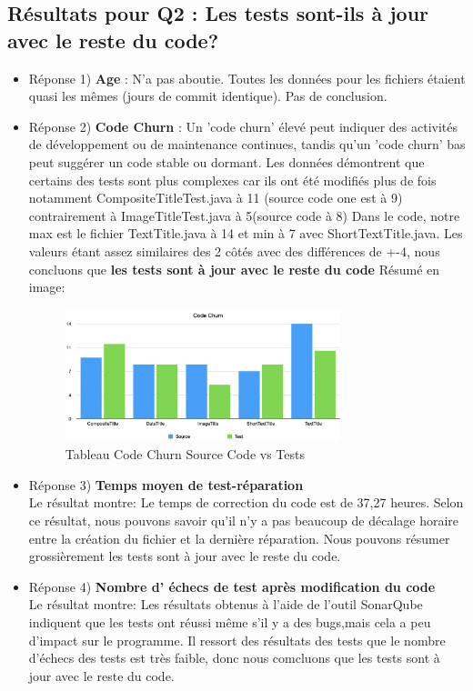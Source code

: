 \documentclass{proc}
\begin{document}
\subsection{Résultats pour Q2 : Les tests sont-ils à jour avec le reste du code?}
\begin{itemize}
    \item Réponse 1) \textbf{Age} : N'a pas aboutie. Toutes les données pour les fichiers étaient quasi les mêmes (jours de commit identique). Pas de conclusion.
    \item Réponse 2) \textbf{Code Churn} : 
Un 'code churn' élevé peut indiquer des activités de développement ou de maintenance continues, tandis qu'un 'code churn' bas peut suggérer un code stable ou dormant. Les données démontrent que certains des tests sont plus complexes car ils ont été modifiés plus de fois notamment CompositeTitleTest.java à 11 (source code one est à 9) contrairement à ImageTitleTest.java à 5(source code à 8) Dans le code, notre max est le fichier TextTitle.java à 14 et min à 7 avec ShortTextTitle.java. Les valeurs étant assez similaires des 2 côtés avec des différences de +-4, nous concluons que \textbf{les tests sont à jour avec le reste du code}
Résumé en image:\\
\begin{figure}[htp]
\includegraphics[width=8cm]{codechurn.png}
\caption{Tableau Code Churn Source Code vs Tests }
\end{figure}
    \item Réponse 3) \textbf{Temps moyen de test-réparation}
    \\Le résultat montre: Le temps de correction du code est de 37,27 heures. Selon ce résultat, nous pouvons savoir qu'il n'y a pas beaucoup de décalage horaire entre la création du fichier et la dernière réparation. Nous pouvons résumer grossièrement les tests sont à jour avec le reste du code.
    \item Réponse 4)\textbf{ Nombre d’ échecs de test après modification du code}
    \\Le résultat montre: Les résultats obtenus à l'aide de l'outil SonarQube indiquent que les tests ont réussi même s'il y a des bugs,mais cela a peu d'impact sur le programme. Il ressort des résultats des tests que le nombre d'échecs des tests est très faible, donc nous comcluons que les tests sont à jour avec le reste du code.
\end{itemize}
\end{document}

